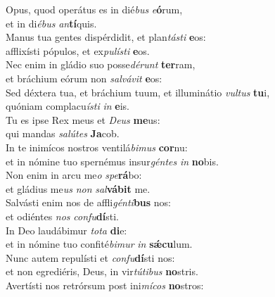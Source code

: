 \evenverse Opus, quod operátus es in dié\textit{bus} \textit{e}\textbf{ó}rum,~\*\\
\evenverse et in di\textit{é}\textit{bus} \textit{an}\textbf{tí}quis.\\
\oddverse Manus tua gentes dispérdidit, et plan\textit{tá}\textit{sti} \textbf{e}os:~\*\\
\oddverse afflixísti pópulos, et ex\textit{pu}\textit{lí}\textit{sti} \textbf{e}os.\\
\evenverse Nec enim in gládio suo posse\textit{dé}\textit{runt} \textbf{ter}ram,~\*\\
\evenverse et bráchium eórum non \textit{sal}\textit{vá}\textit{vit} \textbf{e}os:\\
\oddverse Sed déxtera tua, et bráchium tuum, et illuminátio \textit{vul}\textit{tus} \textbf{tu}i,~\*\\
\oddverse quóniam complacu\textit{í}\textit{sti} \textit{in} \textbf{e}is.\\
\evenverse Tu es ipse Rex meus et \textit{De}\textit{us} \textbf{me}us:~\*\\
\evenverse qui mandas \textit{sa}\textit{lú}\textit{tes} \textbf{Ja}cob.\\
\oddverse In te inimícos nostros ventilá\textit{bi}\textit{mus} \textbf{cor}nu:~\*\\
\oddverse et in nómine tuo spernémus insur\textit{gén}\textit{tes} \textit{in} \textbf{no}bis.\\
\evenverse Non enim in arcu me\textit{o} \textit{spe}\textbf{rá}bo:~\*\\
\evenverse et gládius me\textit{us} \textit{non} \textit{sal}\textbf{vá}\textbf{bit} me.\\
\oddverse Salvásti enim nos de affli\textit{gén}\textit{ti}\textbf{bus} nos:~\*\\
\oddverse et odiéntes \textit{nos} \textit{con}\textit{fu}\textbf{dí}sti.\\
\evenverse In Deo laudábimur \textit{to}\textit{ta} \textbf{di}e:~\*\\
\evenverse et in nómine tuo confité\textit{bi}\textit{mur} \textit{in} \textbf{sǽ}\textbf{cu}lum.\\
\oddverse Nunc autem repulísti et \textit{con}\textit{fu}\textbf{dí}sti nos:~\*\\
\oddverse et non egrediéris, Deus, in vir\textit{tú}\textit{ti}\textit{bus} \textbf{no}stris.\\
\evenverse Avertísti nos retrórsum post ini\textit{mí}\textit{cos} \textbf{no}stros:~\*\\
